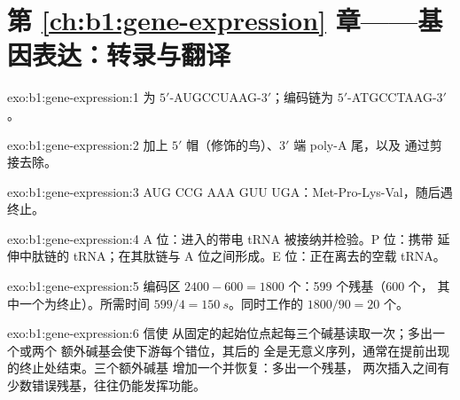\section*{第 \ref{ch:b1:gene-expression} 章——基因表达：转录与翻译}

\begin{solution}{exo:b1:gene-expression:1}
 为 $5'$-AUGCCUAAG-$3'$；编码链为 $5'$-ATGCCTAAG-$3'$。
\end{solution}

\begin{solution}{exo:b1:gene-expression:2}
加上 $5'$ 帽（修饰的鸟）、$3'$ 端 poly-A 尾，以及
通过剪接去除。
\end{solution}

\begin{solution}{exo:b1:gene-expression:3}
AUG CCG AAA GUU UGA：Met-Pro-Lys-Val，随后遇终止。
\end{solution}

\begin{solution}{exo:b1:gene-expression:4}
A 位：进入的带电 tRNA 被接纳并检验。P 位：携带
延伸中肽链的 tRNA；在其肽链与
A 位之间形成。E 位：正在离去的空载 tRNA。
\end{solution}

\begin{solution}{exo:b1:gene-expression:5}
编码区 $2400 - 600 = 1800$ 个：599 个残基（600 个，
其中一个为终止）。所需时间 $599/4 = \qty{150}{s}$。同时工作的 $1800/90 = 20$ 个。
\end{solution}

\begin{solution}{exo:b1:gene-expression:6}
信使  从固定的起始位点起每三个碱基读取一次；多出一个或两个
额外碱基会使下游每个错位，其后的
全是无意义序列，通常在提前出现的终止处结束。三个额外碱基
增加一个并恢复：多出一个残基，
两次插入之间有少数错误残基，往往仍能发挥功能。
\end{solution}

